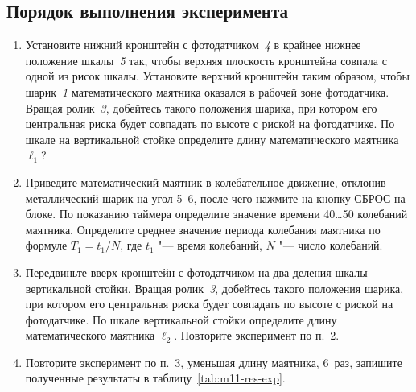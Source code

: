 \documentclass[a4paper, 12pt]{extarticle}
\begin{document}
\subsection{Порядок выполнения эксперимента}
\begin{enumerate}
\item Установите нижний кронштейн с фотодатчиком~\emph{4} в крайнее нижнее положение шкалы~\emph{5} так, чтобы верхняя плоскость кронштейна совпала с одной из рисок шкалы. Установите верхний кронштейн таким образом, чтобы шарик~\emph{1} математического маятника оказался в рабочей зоне фотодатчика. Вращая  ролик~\emph{3}, добейтесь такого положения шарика, при котором его центральная риска будет совпадать по высоте с риской на     фотодатчике. По шкале на вертикальной стойке определите длину математического маятника~$\ell_1$? 
\item Приведите математический маятник в колебательное движение, отклонив металлический шарик на угол 5--6\degree, после чего нажмите на кнопку СБРОС на блоке. По показанию таймера определите значение времени 40…50 колебаний маятника. Определите среднее значение периода колебания маятника по формуле $T_1 = t_1 / N$, где $t_1$ "--- время колебаний, $N$ "--- число колебаний. %
\item Передвиньте вверх кронштейн с фотодатчиком на два деления шкалы вертикальной стойки. Вращая ролик~\emph{3}, добейтесь такого положения шарика, при котором его центральная риска будет совпадать по высоте с риской  на фотодатчике. По шкале вертикальной стойки определите длину математического маятника $\ell_2$. Повторите эксперимент по п.~2. 
\item Повторите эксперимент по п.~3, уменьшая длину маятника, 6~раз, запишите  полученные результаты в таблицу~\ref{tab:m11-res-exp}. %


\end{enumerate}
\end{document}
